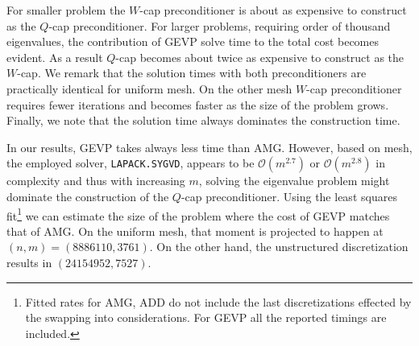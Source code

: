 \documentclass[10pt, a4paper]{article}
\begin{document}
For smaller problem the $W$-cap preconditioner is about as expensive to construct 
as the $Q$-cap preconditioner. For larger problems, requiring order of thousand
eigenvalues, the contribution of GEVP solve time to the total cost becomes
evident. As a result $Q$-cap becomes about twice as expensive to construct as the 
$W$-cap. We remark that the solution times with both preconditioners are
practically identical for uniform mesh. On the other mesh $W$-cap
preconditioner requires fewer iterations and becomes faster as the size of the 
problem grows. Finally, we note that the solution time always dominates the 
construction time.

In our results, GEVP takes always less time than AMG. However, based on mesh, 
the employed solver, \texttt{LAPACK.SYGVD}, appears to be $\mathcal{O}(m^{2.7})$
or $\mathcal{O}(m^{2.8})$ in complexity and thus with increasing $m$, solving 
the eigenvalue problem might dominate the construction of the $Q$-cap preconditioner.
Using the least squares fit\footnote{Fitted rates for AMG, ADD do not include the last
discretizations effected by the swapping into considerations. For GEVP all the
reported timings are included.} we can estimate the size of the problem where the
cost of GEVP matches that of AMG. On the uniform mesh, that moment is
projected to happen at $(n, m)=(8886110, 3761)$. On the other hand, the
unstructured discretization results in $(24154952, 7527)$. 
\end{document}

